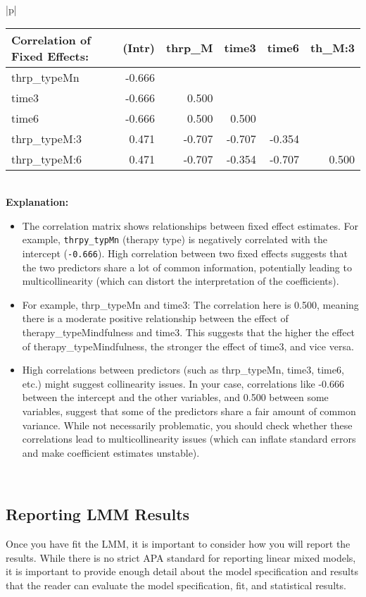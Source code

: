 {\begin{longtable}{|p{\linewidth}|}
\begin{tabular}{lrrrrr}
\textbf{Correlation of Fixed Effects:} & \textbf{(Intr)} & \textbf{thrp\_M} & \textbf{time3} & \textbf{time6} & \textbf{th\_M:3} \\
\hline
thrp\_typeMn & -0.666 & & & & \\
time3 & -0.666 & 0.500 & & & \\
time6 & -0.666 & 0.500 & 0.500 & & \\
thrp\_typeM:3 & 0.471 & -0.707 & -0.707 & -0.354 & \\
thrp\_typeM:6 & 0.471 & -0.707 & -0.354 & -0.707 & 0.500 \\
\hline
\end{tabular} \\ 
\hline
\textbf{Explanation:} \newline 
\begin{itemize}
\item The correlation matrix shows relationships between fixed effect estimates. For example, \texttt{thrpy\_typMn} (therapy type) is negatively correlated with the intercept (\texttt{-0.666}). High correlation between two fixed effects suggests that the two predictors share a lot of common information, potentially leading to multicollinearity (which can distort the interpretation of the coefficients). 
\item For example, thrp\_typeMn and time3: The correlation here is 0.500, meaning there is a moderate positive relationship between the effect of therapy\_typeMindfulness and time3. This suggests that the higher the effect of therapy\_typeMindfulness, the stronger the effect of time3, and vice versa.
\item High correlations between predictors (such as thrp\_typeMn, time3, time6, etc.) might suggest collinearity issues. In your case, correlations like -0.666 between the intercept and the other variables, and 0.500 between some variables, suggest that some of the predictors share a fair amount of common variance. While not necessarily problematic, you should check whether these correlations lead to multicollinearity issues (which can inflate standard errors and make coefficient estimates unstable).\end{itemize}\\
\hline
\caption{Summary of the LMM fit}
\label{table:LMMfit1}
\end{longtable}
}

\subsection*{Reporting LMM Results}
Once you have fit the LMM, it is important to consider how you will report the results. While there is no strict APA standard for reporting linear mixed models, it is important to provide enough detail about the model specification and results that the reader can evaluate the model specification, fit, and statistical results.  

